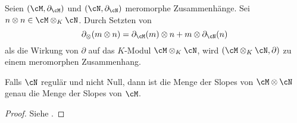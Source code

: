 \begin{prop} \label{prop:tensorZusammenhang}
Seien $(\cM,\partial_\cM)$ und $(\cN,\partial_\cN)$ meromorphe Zusammenhänge.
Sei $n\otimes n\in \cM\otimes_K\cN$.
Durch Setzten von
\begin{equation} \label{eq:TensorAbleiten}
\partial_\otimes(m\otimes n)=\partial_\cM(m)\otimes n +m\otimes \partial_\cN(n)
\end{equation}
als die Wirkung von $\partial$ auf das $K$-Modul $\cM\otimes_K\cN$, wird
$(\cM\otimes_K\cN,\partial)$ zu einem meromorphen Zusammenhang.
\begin{comment}
\cite[Prop 4.1.1]{SchneidersDmod}
\end{comment}
\end{prop}
\begin{comment}
TODO: Zeige universelle Eigenschaft
\end{comment}
\begin{comment}
\begin{proof}
Klar
\end{proof}
\end{comment}
\begin{lem} 
Falls $\cN$ regulär und nicht Null, dann ist die Menge der Slopes von
$\cM\otimes\cN$ genau die Menge der Slopes von $\cM$.
\end{lem}
\begin{proof}
Siehe \cite[Ex 5.3.7]{sabbah_cimpa90}.
\begin{comment}
TODO
\end{comment}
\end{proof}

